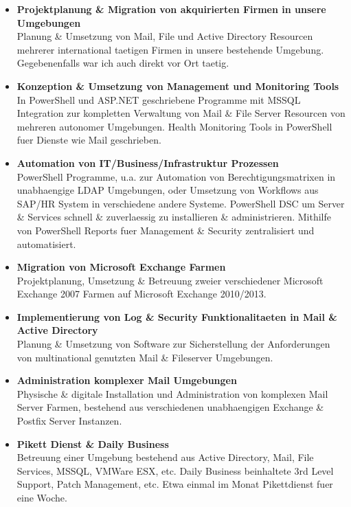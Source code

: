 \documentclass{cv}
\begin{document}
\begin{CJK*}{UTF8}{bsmi}
\begin{itemize}
    \item \textbf{Projektplanung \& Migration von akquirierten Firmen in unsere Umgebungen}\\ Planung \& Umsetzung von Mail, File und Active Directory Resourcen mehrerer international taetigen Firmen in unsere bestehende Umgebung. Gegebenenfalls war ich auch direkt vor Ort taetig.
    \item \textbf{Konzeption \& Umsetzung von Management und Monitoring Tools}\\
    In PowerShell und ASP.NET geschriebene Programme mit MSSQL Integration zur kompletten Verwaltung von Mail \& File Server Resourcen von mehreren autonomer Umgebungen. Health Monitoring Tools in PowerShell fuer Dienste wie Mail geschrieben.
    \item \textbf{Automation von IT/Business/Infrastruktur Prozessen}\\
    PowerShell Programme, u.a. zur Automation von Berechtigungsmatrixen in unabhaengige LDAP Umgebungen, oder Umsetzung von Workflows aus SAP/HR System in verschiedene andere Systeme. PowerShell DSC um Server \& Services schnell \& zuverlaessig zu installieren \& administrieren. Mithilfe von PowerShell Reports fuer Management \& Security zentralisiert und automatisiert.
    \item \textbf{Migration von Microsoft Exchange Farmen}\\
    Projektplanung, Umsetzung \& Betreuung zweier verschiedener Microsoft Exchange 2007 Farmen auf Microsoft Exchange 2010/2013.
    \item \textbf{Implementierung von Log \& Security Funktionalitaeten in Mail \& Active Directory}\\
    Planung \& Umsetzung von Software zur Sicherstellung der Anforderungen von multinational genutzten Mail \& Fileserver Umgebungen.
    \item \textbf{Administration komplexer Mail Umgebungen}\\
    Physische \& digitale Installation und Administration von komplexen Mail Server Farmen, bestehend aus verschiedenen unabhaengigen Exchange \& Postfix Server Instanzen.
    \item \textbf{Pikett Dienst \& Daily Business}\\
    Betreuung einer Umgebung bestehend aus Active Directory, Mail, File Services, MSSQL, VMWare ESX, etc. Daily Business beinhaltete 3rd Level Support, Patch Management, etc. Etwa einmal im Monat Pikettdienst fuer eine Woche.
\end{itemize}


\end{CJK*}
\end{document}
